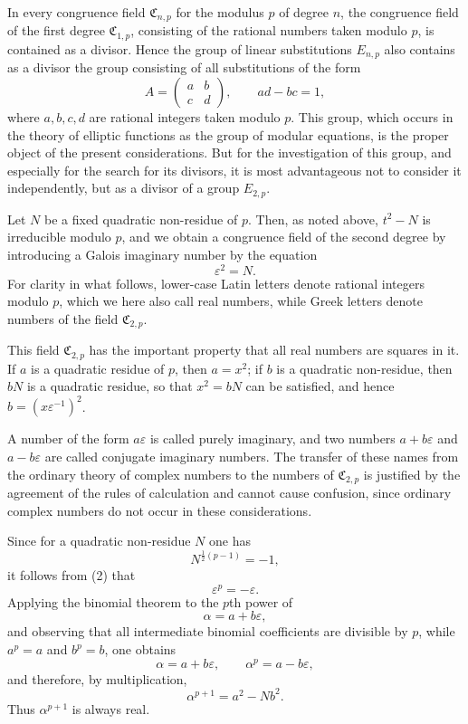\documentclass[11pt]{article}
\providecommand{\mat}[4]{\begin{pmatrix}#1&#2\\#3&#4\end{pmatrix}}
\providecommand{\mat}[4]{\begin{pmatrix}#1&#2\\#3&#4\end{pmatrix}}
\providecommand{\Cfield}{\mathfrak C}
\providecommand{\mat}[1]{\begin{pmatrix}#1\end{pmatrix}}
\begin{document}
In every congruence field $\Cfield_{n,p}$ for the modulus $p$ of degree $n$, the congruence field of the first degree $\Cfield_{1,p}$, consisting of the rational numbers taken modulo $p$, is contained as a divisor. Hence the group of linear substitutions $E_{n,p}$ also contains as a divisor the group consisting of all substitutions of the form
\begin{equation}
 A=\mat{a}{b}{c}{d},\qquad ad-bc=1,
 \tag{1}
\end{equation}
where $a,b,c,d$ are rational integers taken modulo $p$. This group, which occurs in the theory of elliptic functions as the group of modular equations, is the proper object of the present considerations. But for the investigation of this group, and especially for the search for its divisors, it is most advantageous not to consider it independently, but as a divisor of a group $E_{2,p}$.

Let $N$ be a fixed quadratic non-residue of $p$. Then, as noted above, $t^2-N$ is irreducible modulo $p$, and we obtain a congruence field of the second degree by introducing a Galois imaginary number by the equation
\begin{equation}
 \varepsilon^2=N.
 \tag{2}
\end{equation}
For clarity in what follows, lower-case Latin letters denote rational integers modulo $p$, which we here also call real numbers, while Greek letters denote numbers of the field $\Cfield_{2,p}$.

This field $\Cfield_{2,p}$ has the important property that all real numbers are squares in it. If $a$ is a quadratic residue of $p$, then $a=x^2$; if $b$ is a quadratic non-residue, then $bN$ is a quadratic residue, so that $x^2=bN$ can be satisfied, and hence $b=(x\varepsilon^{-1})^2$.

A number of the form $a\varepsilon$ is called purely imaginary, and two numbers $a+b\varepsilon$ and $a-b\varepsilon$ are called conjugate imaginary numbers. The transfer of these names from the ordinary theory of complex numbers to the numbers of $\Cfield_{2,p}$ is justified by the agreement of the rules of calculation and cannot cause confusion, since ordinary complex numbers do not occur in these considerations.

Since for a quadratic non-residue $N$ one has
\[
 N^{\frac12(p-1)}=-1,
\]
it follows from (2) that
\begin{equation}
 \varepsilon^p=-\varepsilon .
 \tag{3}
\end{equation}
Applying the binomial theorem to the $p$th power of
\[
 \alpha=a+b\varepsilon,
\]
and observing that all intermediate binomial coefficients are divisible by $p$, while $a^p=a$ and $b^p=b$, one obtains
\begin{equation}
 \alpha=a+b\varepsilon,
 \qquad \alpha^p=a-b\varepsilon,
 \tag{4}
\end{equation}
and therefore, by multiplication,
\begin{equation}
 \alpha^{p+1}=a^2-Nb^2.
 \tag{5}
\end{equation}
Thus $\alpha^{p+1}$ is always real.
\end{document}
